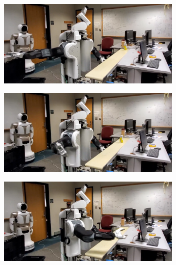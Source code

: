\documentclass[a4paper]{report}
\begin{document}
\begin{figure}[t]
    \centering
    \begin{subfigure}{0.48\textwidth}
        \includegraphics[trim=0 0 400 0, clip, width=\textwidth]{1}
        \caption{}
        \label{fig:demo1}
    \end{subfigure}
    \hspace{2mm}
    \begin{subfigure}{0.48\textwidth}
        \includegraphics[trim=0 0 400 0, clip, width=\textwidth]{2}
        \caption{}
        \label{fig:demo2}
    \end{subfigure}
    \hspace{2mm}
    \begin{subfigure}{0.48\textwidth}
        \includegraphics[trim=0 0 400 0, clip, width=\textwidth]{3}

\end{subfigure}
\end{figure}
\end{document}
